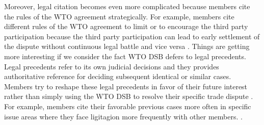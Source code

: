 Moreover, legal citation becomes even more complicated because members cite the
rules of the WTO agreement strategically. For example,
members cite different rules of the WTO agreement to limit or to encourage
the third party participation because the third party
participation can lead to early settlement of the dispute without continuous
legal battle and vice versa  \cite{who_gets}.
Things are getting more interesting
if we consider the fact WTO DSB defers to legal precedents.
Legal precedents refer to its own judicial decisions
and they provides authoritative reference
for deciding subsequent identical or similar cases.
Members try to reshape these legal precedents
in favor of their future interest rather than
simply using the WTO DSB to resolve their specific trade
dispute \citep{pelc}. For example,
members cite their
favorable previous cases more often in specific
issue areas where they face ligitagion more frequently with other members.
\citep{latent}.
 
 
